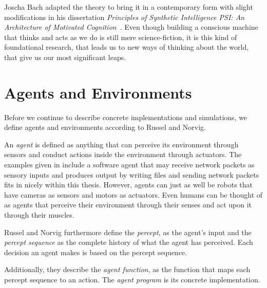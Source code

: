 
Joscha Bach adapted the theory to bring it in a contemporary form with slight modifications in his dissertation \emph{Principles of Synthetic Intelligence PSI: An Architecture of Motivated Cognition}~\cite{Bach:2009:PSI:1611304}. Even though building a conscious machine that thinks and acts as we do is still mere science-fiction, it is this kind of foundational research, that leads us to new ways of thinking about the world, that give us our most significant leaps.
    
    \section{Agents and Environments}


Before we continue to describe concrete implementations and simulations, we define agents and environments according to Russel and Norvig.~\cite{russell2009artificial} 


An \emph{agent} is defined as anything that can perceive its environment through sensors and conduct actions inside the environment through actuators. The examples given in \cite{russell2009artificial} include a software agent that may receive network packets as sensory inputs and produces output by writing files and sending network packets fits in nicely within this thesis. However, agents can just as well be robots that have cameras as sensors and motors as actuators. Even humans can be thought of as agents that perceive their environment through their senses and act upon it through their muscles.

Russel and Norvig furthermore define the \emph{percept}, as the agent's input and the \emph{percept sequence} as the complete history of what the agent has perceived. Each decision an agent makes is based on the percept sequence.

Additionally, they describe the \emph{agent function}, as the function that maps each percept sequence to an action. The \emph{agent program} is its concrete implementation.

